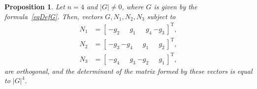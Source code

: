 \documentclass[10pt,reqno]{amsart}
\newcommand{\trans}{{\scriptscriptstyle \mathrm{T}}}
\theoremstyle{plain}
\newtheorem{Proposition}{Proposition}
\theoremstyle{remark}
\begin{document}
\begin{Proposition}\label{propDim4}
Let $n = 4$ and $|G| \neq 0$, where $G$ is given by the formula~\eqref{eqDefG}. Then, vectors $G,N_1,N_2,N_3$ subject to
\begin{equation}\label{eqBasisDim4}
  \begin{aligned}
    N_1 & = [ \, {-g_2} ~ \phantom{-}g_1 ~ \phantom{-}g_4 ~ {-g_3} \, ]^\trans, \\
    N_2 & = [ \, {-g_3} ~ {-g_4} ~ \phantom{-}g_1 ~ \phantom{-}g_2 \, ]^\trans, \\
    N_3 & = [ \, {-g_4} ~ \phantom{-}g_3 ~ {-g_2} ~ \phantom{-}g_1 \, ]^\trans,
  \end{aligned}
\end{equation}
are orthogonal, and the determinant of the matrix formed by these vectors is equal to $|G|^4$.
\end{Proposition}
\end{document}
